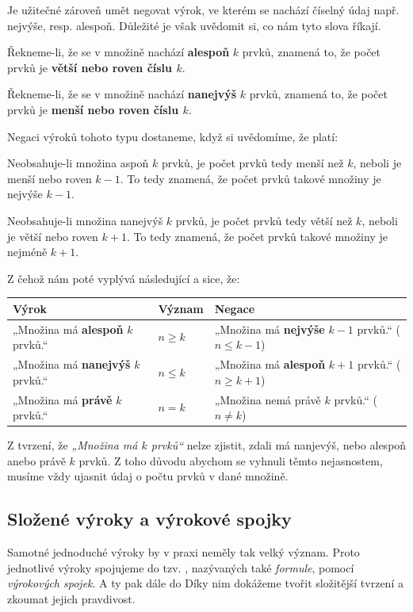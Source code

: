 \documentclass[12pt,a4paper]{article}
\begin{document}
Je užitečné zároveň umět negovat výrok, ve kterém se nachází číselný údaj např. nejvýše, resp. alespoň.
Důležité je však uvědomit si, co nám tyto slova říkají.

\begin{notebox}
    Řekneme-li, že se v množině nachází \textbf{alespoň} $k$ prvků, znamená to, že počet prvků je \textbf{větší nebo roven číslu $k$}.

    Řekneme-li, že se v množině nachází \textbf{nanejvýš} $k$ prvků, znamená to, že počet prvků je \textbf{menší nebo roven číslu $k$}.
\end{notebox}

Negaci výroků tohoto typu dostaneme, když si uvědomíme, že  platí:

Neobsahuje-li množina aspoň $k$ prvků, je počet prvků tedy menší než $k$, neboli je menší nebo roven $k-1$. To tedy znamená, že počet prvků takové množiny je nejvýše $k-1$.

Neobsahuje-li množina nanejvýš $k$ prvků, je počet prvků tedy větší než $k$, neboli je větší nebo roven $k+1$. To tedy znamená, že počet prvků takové množiny je nejméně $k+1$.

Z čehož nám poté vyplývá následující a sice, že:
\begin{center}
\renewcommand{\arraystretch}{1.3}
\begin{tabular}{|C{5cm}|C{2cm}|C{7cm}|}
\hline
{}
\textbf{Výrok} & \textbf{Význam} & \textbf{Negace} \\
\hline
„Množina má \textbf{alespoň} $k$ prvků.“ 
& $n \geq k$
& „Množina má \textbf{nejvýše} $k-1$ prvků.“ \quad ($n \leq k-1$) \\
\hline
„Množina má \textbf{nanejvýš} $k$ prvků.“ 
& $n \leq k$
& „Množina má \textbf{alespoň} $k+1$ prvků.“ \quad ($n \geq k+1$) \\
\hline
„Množina má \textbf{právě} $k$ prvků.“ 
& $n = k$
& „Množina nemá právě $k$ prvků.“ \quad ($n \neq k$) \\
\hline
\end{tabular}
\end{center}

\begin{notebox}
    Z tvrzení, že \emph{„Množina má $k$ prvků“} nelze zjistit, zdali má nanjevýš, nebo alespoň anebo právě $k$ prvků. 
    Z toho důvodu abychom se vyhnuli těmto nejasnostem, musíme vždy ujasnit údaj o počtu prvků v dané množině.
\end{notebox}
\subsection{Složené výroky a výrokové spojky}
Samotné jednoduché výroky by v praxi neměly tak velký význam.  
Proto jednotlivé výroky spojujeme do tzv. , nazývaných také \emph{formule}, pomocí \emph{výrokových spojek}.
A ty pak dále do 
Díky nim dokážeme tvořit složitější tvrzení a zkoumat jejich pravdivost.  
\end{document}

